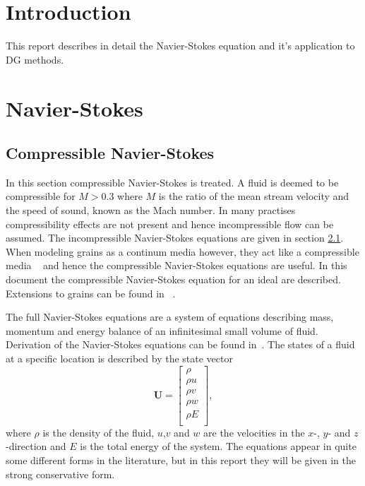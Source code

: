 \documentclass{report}
\begin{document}
\chapter{Introduction}

This report describes in detail the Navier-Stokes equation and it's application to DG methods.


\chapter{Navier-Stokes}
\section{Compressible Navier-Stokes}
In this section compressible Navier-Stokes is treated. A fluid is deemed to be compressible for $M > 0.3$ where $M$ is the ratio of the mean stream velocity and the speed of sound, known as the Mach number. In many practises compressibility effects are not present and hence incompressible flow can be assumed. The incompressible Navier-Stokes equations are given in section \ref{}. When modeling grains as a continum media however, they act like a compressible media ~\cite{} and hence the compressible Navier-Stokes equations are useful. In this document the compressible Navier-Stokes equation for an ideal are described. Extensions to grains can be found in ~\cite{}.

The full Navier-Stokes equations are a system of equations describing mass, momentum and energy balance of an infinitesimal small volume of fluid. Derivation of the Navier-Stokes equations can be found in~\cite{}. The states of a fluid at a specific location is described by the state vector
\begin{equation}
\label{e:stateVector}
\mathbf{U} =
\left[
\begin{array}{c}
\rho 		\\
\rho u	 	\\
\rho v		\\
\rho w		\\
\rho E		\\
\end{array}
\right],
\end{equation}
where $\rho$ is the density of the fluid, $u$,$v$ and $w$ are the velocities in the $x$-, $y$- and $z$-direction and $E$ is the total energy of the system. The equations appear in quite some different forms in the literature, but in this report they will be given in the strong conservative form.
\end{document}
